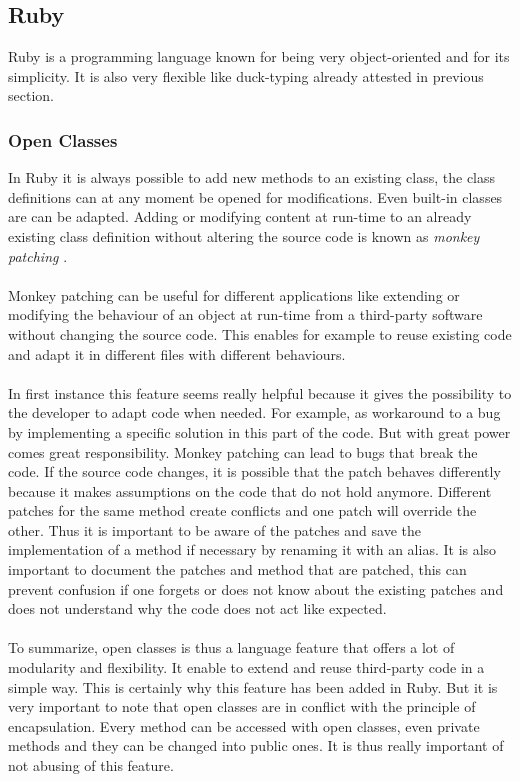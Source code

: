 \documentclass[12pt,a4paper,twocolumn]{article}
\begin{document}
\subsection{Ruby}
Ruby is a programming language known for being very object-oriented and for its simplicity. It is also very flexible like duck-typing already attested in previous section.
\subsubsection{Open Classes}
In Ruby it is always possible to add new methods to an existing class, the class definitions can at any moment be opened for modifications. Even built-in classes are can be adapted. Adding or modifying content at run-time to an already existing class definition without altering the source code is known as \emph{monkey patching} \cite{wiki:monkey}. 
\\
\\
Monkey patching can be useful for different applications like extending or modifying the behaviour of an object at run-time from a third-party software without changing the source code. This enables for example to reuse existing code and adapt it in different files with different behaviours.
\\
\\
In first instance this feature seems really helpful because it gives the possibility to the developer to adapt code when needed. For example, as workaround to a bug by implementing a specific solution in this part of the code. But with great power comes great responsibility. Monkey patching can lead to bugs that break the code. If the source code changes, it is possible that the patch behaves differently because it makes assumptions on the code that do not hold anymore. Different patches for the same method create conflicts and one patch will override the other. Thus it is important to be aware of the patches and save the implementation of a method if necessary by renaming it with an alias. It is also important to document the patches and method that are patched, this can prevent confusion if one forgets or does not know about the existing patches and does not understand why the code does not act like expected.
\\
\\
To summarize, open classes is thus a language feature that offers a lot of modularity and flexibility. It enable to extend and reuse third-party code in a simple way. This is certainly why this feature has been added in Ruby. But it is very important to note that open classes are in conflict with the principle of encapsulation. Every method can be accessed with open classes, even private methods and they can  be changed into public ones. It is thus really important of not abusing of this feature. 
\end{document}
